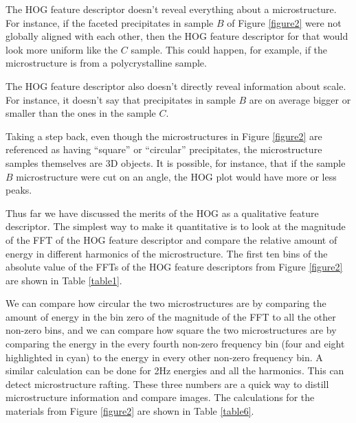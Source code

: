 \documentclass[review]{elsarticle}
\begin{document}
	The HOG feature descriptor doesn't reveal everything about a microstructure. For instance, if the faceted precipitates in sample $B$ of Figure \ref{figure2} were not globally aligned with each other, then the HOG feature descriptor for that would look more uniform like the $C$ sample. This could happen, for example, if the microstructure is from a polycrystalline sample.
	
	The HOG feature descriptor also doesn't directly reveal information about scale. For instance, it doesn't say that precipitates in sample $B$ are on average bigger or smaller than the ones in the sample $C$.%
	
	Taking a step back, even though the microstructures in Figure \ref{figure2} are referenced as having ``square'' or ``circular'' precipitates, the microstructure samples themselves are 3D objects. It is possible, for instance, that if the sample $B$ microstructure were cut on an angle, the HOG plot would have more or less peaks.

	Thus far we have discussed the merits of the HOG as a qualitative feature descriptor. The simplest way to make it quantitative is to look at the magnitude of the FFT of the HOG feature descriptor and compare the relative amount of energy in different harmonics of the microstructure. The first ten bins of the absolute value of the FFTs of the HOG feature descriptors from Figure \ref{figure2} are shown in Table \ref{table1}.
	
  	We can compare how circular the two microstructures are by comparing the amount of energy in the bin zero of the magnitude of the FFT to all the other non-zero bins, and we can compare how square the two microstructures are by comparing the energy in the every fourth non-zero frequency bin (four and eight highlighted in cyan) to the energy in every other non-zero frequency bin. A similar calculation can be done for 2Hz energies and all the harmonics. This can detect microstructure rafting. These three numbers are a quick way to distill microstructure information and compare images. The calculations for the materials from Figure \ref{figure2} are shown in Table \ref{table6}.
\end{document}
